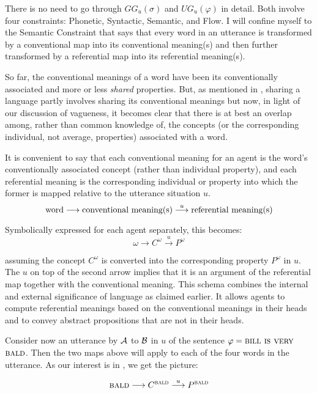There is no need to go through $GG_u(\sigma)$ and $UG_u(\varphi)$ in detail. Both involve four constraints: Phonetic, Syntactic, Semantic, and Flow. I will confine myself to the Semantic Constraint that says that every word in an utterance is transformed by a conventional map into its conventional meaning(s) and then further transformed by a referential map into its referential meaning(s). 

So far, the conventional meanings of a word have been its conventionally associated and more or less \emph{shared} properties. But, as mentioned in , sharing a language partly involves sharing its conventional meanings but now, in light of our discussion of vagueness, it becomes clear that there is at best an overlap among, rather than common knowledge of, the concepts (or the corresponding individual, not average, properties) associated with a word. 

It is convenient to say that each conventional meaning for an agent is the word's conventionally associated concept (rather than individual property), and each referential meaning is the corresponding individual or property into which the former is mapped relative to the utterance situation $u$.
\[ \hbox{word} \longrightarrow \hbox{conventional meaning(s)} \stackrel{u}\longrightarrow \hbox{referential meaning(s)} \]

\noindent Symbolically expressed for each agent separately, this becomes:
\[ \omega \longrightarrow C^{\omega} \stackrel{u}\longrightarrow P^\omega \]

\noindent assuming the concept $C^{\omega}$ is converted into the corresponding property $P^\omega$ in $u$. The $u$ on top of the second arrow implies that it is an argument of the referential map together with the conventional meaning. This schema combines the internal and external significance of language as claimed earlier. It allows agents to compute referential meanings based on the conventional meanings in their heads and to convey abstract propositions that are not in their heads.

Consider now an utterance by $\cal A$ to $\cal B$ in $u$ of the sentence $\varphi = \Expression{Bill is very}$\linebreak$\Expression{bald}$. Then the two maps above will apply to each of the four words in the utterance. As our interest is in , we get the picture:\label{page:vague communication}


\[ \Expression{bald} \longrightarrow C^{\Expression{bald}} \stackrel{u}\longrightarrow P^\Expression{bald} \]

